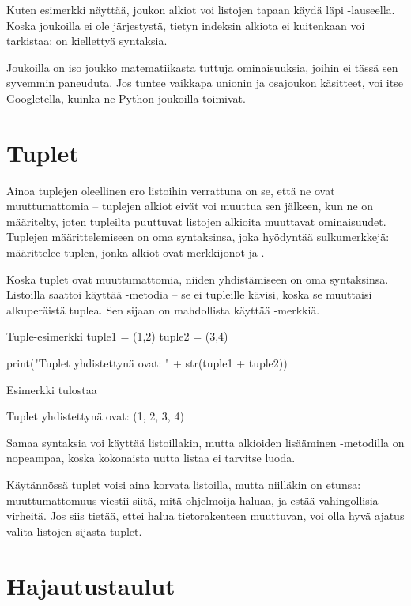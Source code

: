 Kuten esimerkki näyttää, joukon alkiot voi listojen tapaan käydä läpi -lauseella. Koska joukoilla ei ole järjestystä, tietyn indeksin alkiota ei kuitenkaan voi tarkistaa:  on kiellettyä syntaksia.

Joukoilla on iso joukko matematiikasta tuttuja ominaisuuksia, joihin ei tässä sen syvemmin paneuduta. Jos tuntee vaikkapa unionin ja osajoukon käsitteet, voi itse Googletella, kuinka ne Python-joukoilla toimivat.

\section{Tuplet}

Ainoa tuplejen oleellinen ero listoihin verrattuna on se, että ne ovat muuttumattomia -- tuplejen alkiot eivät voi muuttua sen jälkeen, kun ne on määritelty, joten tupleilta puuttuvat listojen alkioita muuttavat ominaisuudet. Tuplejen määrittelemiseen on oma syntaksinsa, joka hyödyntää sulkumerkkejä:  määrittelee tuplen, jonka alkiot ovat merkkijonot  ja .

Koska tuplet ovat muuttumattomia, niiden yhdistämiseen on oma syntaksinsa. Listoilla saattoi käyttää -metodia -- se ei tupleille kävisi, koska se muuttaisi alkuperäistä tuplea. Sen sijaan on mahdollista käyttää \code{+}-merkkiä.

\begin{example}{Tuple-esimerkki}
tuple1 = (1,2)
tuple2 = (3,4)

print("Tuplet yhdistettynä ovat: " + str(tuple1 + tuple2))
\end{example}

Esimerkki tulostaa

\begin{output}
Tuplet yhdistettynä ovat: (1, 2, 3, 4)
\end{output}

Samaa syntaksia voi käyttää listoillakin, mutta alkioiden lisääminen -metodilla on nopeampaa, koska kokonaista uutta listaa ei tarvitse luoda.

Käytännössä tuplet voisi aina korvata listoilla, mutta niilläkin on etunsa: muuttumattomuus viestii siitä, mitä ohjelmoija haluaa, ja estää vahingollisia virheitä. Jos siis tietää, ettei halua tietorakenteen muuttuvan, voi olla hyvä ajatus valita listojen sijasta tuplet.

\section{Hajautustaulut}

